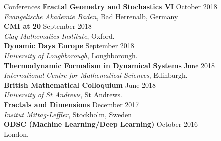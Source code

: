 \documentclass{resume} %
\begin{document}
\begin{rSection}{Conferences} \itemsep -3pt 
{\textbf{Fractal Geometry and Stochastics VI}} \hfill October 2018\\ \emph{Evangelische Akademie Baden}, Bad Herrenalb, Germany\\ 
{\textbf{CMI at 20}} \hfill September 2018\\ \emph{Clay Mathematics Institute}, Oxford.\\ 
{\textbf{Dynamic Days Europe}} \hfill September 2018\\ \emph{University of Loughborough}, Loughborough.\\ 
{\textbf{Thermodynamic Formalism in Dynamical Systems}} \hfill June 2018\\ \emph{International Centre for Mathematical Sciences}, Edinburgh.\\ 
{\textbf{British Mathematical Colloquium}} \hfill June 2018\\ \emph{University of St Andrews}, {St Andrews.} \\ 
{\textbf{Fractals and Dimensions}} \hfill December 2017\\ \emph{Insitut Mittag-Leffler},{ Stockholm, Sweden} \\ 
{\textbf{ODSC (Machine Learning/Deep Learning)}} \hfill October 2016\\ London.  \\ 
\end{rSection}  
\end{document}
